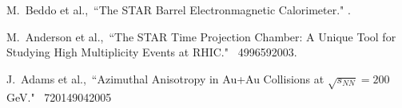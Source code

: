 \begin{thebibliography}{1000}

M.~Beddo et al.,~``The STAR Barrel Electronmagnetic Calorimeter." .

M.~Anderson et al.,~``The STAR Time Projection Chamber: A Unique Tool for Studying High Multiplicity Events at RHIC." \Journal{\NIM } {~499}{659}{2003}.

J.~Adams et al.,~``Azimuthal Anisotropy in Au+Au Collisions at $\sqrt{s_{NN}} = 200$ GeV." \Journal{\PRC} {~72}{014904}{2005}

\end{thebibliography}
